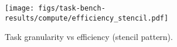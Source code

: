 \begin{figure}[t]
\centering
\texttt{[image: figs/task-bench-results/compute/efficiency\_stencil.pdf]}
\caption{Task granularity vs efficiency (stencil pattern).\label{fig:efficiency}}
\end{figure}
